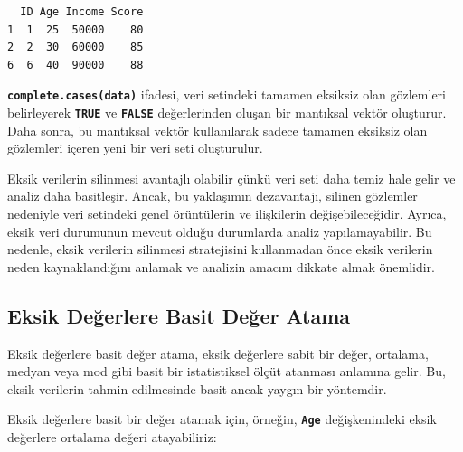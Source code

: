 \documentclass[
  letterpaper,
  DIV=11,
  numbers=noendperiod]{scrreprt}
\newenvironment{Shaded}{\begin{snugshade}}{\end{snugshade}}
\newcommand{\AttributeTok}[1]{\textcolor[rgb]{0.40,0.45,0.13}{#1}}
\newcommand{\CommentTok}[1]{\textcolor[rgb]{0.37,0.37,0.37}{#1}}
\newcommand{\ConstantTok}[1]{\textcolor[rgb]{0.56,0.35,0.01}{#1}}
\newcommand{\FunctionTok}[1]{\textcolor[rgb]{0.28,0.35,0.67}{#1}}
\newcommand{\NormalTok}[1]{\textcolor[rgb]{0.00,0.23,0.31}{#1}}
\newcommand{\OtherTok}[1]{\textcolor[rgb]{0.00,0.23,0.31}{#1}}
\newcommand{\SpecialCharTok}[1]{\textcolor[rgb]{0.37,0.37,0.37}{#1}}
\begin{document}
\begin{verbatim}
  ID Age Income Score
1  1  25  50000    80
2  2  30  60000    85
6  6  40  90000    88
\end{verbatim}

\textbf{\texttt{complete.cases(data)}} ifadesi, veri setindeki tamamen
eksiksiz olan gözlemleri belirleyerek \textbf{\texttt{TRUE}} ve
\textbf{\texttt{FALSE}} değerlerinden oluşan bir mantıksal vektör
oluşturur. Daha sonra, bu mantıksal vektör kullanılarak sadece tamamen
eksiksiz olan gözlemleri içeren yeni bir veri seti oluşturulur.

Eksik verilerin silinmesi avantajlı olabilir çünkü veri seti daha temiz
hale gelir ve analiz daha basitleşir. Ancak, bu yaklaşımın dezavantajı,
silinen gözlemler nedeniyle veri setindeki genel örüntülerin ve
ilişkilerin değişebileceğidir. Ayrıca, eksik veri durumunun mevcut
olduğu durumlarda analiz yapılamayabilir. Bu nedenle, eksik verilerin
silinmesi stratejisini kullanmadan önce eksik verilerin neden
kaynaklandığını anlamak ve analizin amacını dikkate almak önemlidir.

\subsection*{Eksik Değerlere Basit Değer
Atama}\label{eksik-deux11ferlere-basit-deux11fer-atama}

Eksik değerlere basit değer atama, eksik değerlere sabit bir değer,
ortalama, medyan veya mod gibi basit bir istatistiksel ölçüt atanması
anlamına gelir. Bu, eksik verilerin tahmin edilmesinde basit ancak
yaygın bir yöntemdir.

Eksik değerlere basit bir değer atamak için, örneğin,
\textbf{\texttt{Age}} değişkenindeki eksik değerlere ortalama değeri
atayabiliriz:

\begin{Shaded}
\end{Shaded}
\end{document}
